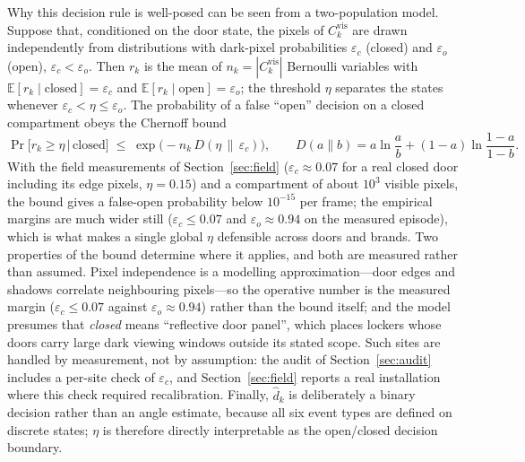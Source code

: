 \documentclass[journal,article,submit,oneauthor]{Definitions/mdpi}
\begin{document}
Why this decision rule is well-posed can be seen from a two-population model. Suppose that,
conditioned on the door state, the pixels of $C_k^{\mathrm{vis}}$ are drawn independently
from distributions with dark-pixel probabilities $\varepsilon_c$ (closed) and
$\varepsilon_o$ (open), $\varepsilon_c < \varepsilon_o$. Then $r_k$ is the mean of
$n_k=|C_k^{\mathrm{vis}}|$ Bernoulli variables with $\mathbb{E}[r_k\mid \text{closed}] =
\varepsilon_c$ and $\mathbb{E}[r_k\mid \text{open}] = \varepsilon_o$; the threshold $\eta$
separates the states whenever $\varepsilon_c < \eta \le \varepsilon_o$. The probability of a
false ``open'' decision on a closed compartment obeys the Chernoff bound
\begin{equation}
\label{eq:chernoff}
\Pr\bigl[r_k \ge \eta \,\big|\, \text{closed}\bigr]
\;\le\; \exp\bigl(-n_k\, D(\eta\,\|\,\varepsilon_c)\bigr),
\qquad
D(a\|b) = a\ln\frac{a}{b} + (1-a)\ln\frac{1-a}{1-b}.
\end{equation}
With the field measurements of Section~\ref{sec:field} ($\varepsilon_c \approx 0.07$ for a
real closed door including its edge pixels, $\eta=0.15$) and a compartment of about
$10^3$ visible pixels, the bound gives a false-open probability below $10^{-15}$ per frame;
the empirical margins are much wider still ($\varepsilon_c \le 0.07$ and
$\varepsilon_o \approx 0.94$ on the measured episode), which is what makes a single global
$\eta$ defensible across doors and brands. Two properties of the bound determine where it
applies, and both are measured rather than assumed. Pixel
independence is a modelling approximation---door edges and shadows correlate neighbouring
pixels---so the operative number is the measured margin ($\varepsilon_c \le 0.07$ against
$\varepsilon_o \approx 0.94$) rather than the bound itself; and the model presumes that
\emph{closed} means ``reflective door panel'', which places lockers whose doors carry large
dark viewing windows outside its stated scope. Such sites are handled by measurement, not
by assumption: the audit of Section~\ref{sec:audit} includes a per-site check of
$\varepsilon_c$, and Section~\ref{sec:field} reports a real installation where this check
required recalibration. Finally, $\hat{d}_k$ is deliberately a binary decision rather than
an angle estimate, because all six event types are defined on discrete states; $\eta$ is
therefore directly interpretable as the open/closed decision boundary.
\end{document}
